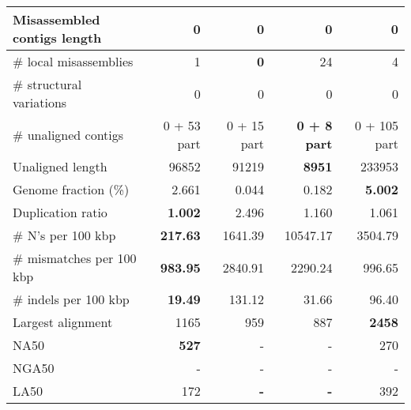 \documentclass[12pt,a4paper]{article}
\begin{document}
\begin{table}[ht]
\begin{center}
\begin{tabular}{|l*{4}{|r}|}
Misassembled contigs length & 0 & 0 & 0 & 0 \\ \hline
\# local misassemblies & 1 & {\bf 0} & 24 & 4 \\ \hline
\# structural variations & 0 & 0 & 0 & 0 \\ \hline
\# unaligned contigs & 0 + 53 part & 0 + 15 part & {\bf 0 + 8 part} & 0 + 105 part \\ \hline
Unaligned length & 96852 & 91219 & {\bf 8951} & 233953 \\ \hline
Genome fraction (\%) & 2.661 & 0.044 & 0.182 & {\bf 5.002} \\ \hline
Duplication ratio & {\bf 1.002} & 2.496 & 1.160 & 1.061 \\ \hline
\# N's per 100 kbp & {\bf 217.63} & 1641.39 & 10547.17 & 3504.79 \\ \hline
\# mismatches per 100 kbp & {\bf 983.95} & 2840.91 & 2290.24 & 996.65 \\ \hline
\# indels per 100 kbp & {\bf 19.49} & 131.12 & 31.66 & 96.40 \\ \hline
Largest alignment & 1165 & 959 & 887 & {\bf 2458} \\ \hline
NA50 & {\bf 527} & - & - & 270 \\ \hline
NGA50 & - & - & - & - \\ \hline
LA50 & 172 & {\bf -} & {\bf -} & 392 \\ \hline
\end{tabular}
\end{center}
\end{table}
\end{document}
